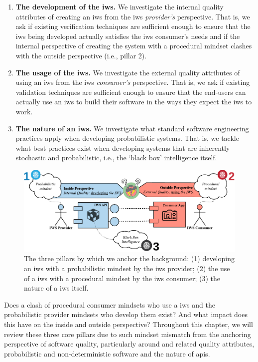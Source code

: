 \begin{enumerate}[label=\textbf{(\arabic*})]
\item \textbf{The development of the \gls{iws}.} We investigate the internal quality attributes of creating an \gls{iws} from the \gls{iws} \textit{provider's} perspective. That is, we ask if existing verification techniques are sufficient enough to ensure that the \gls{iws} being developed actually satisfies the \gls{iws} consumer's needs and if the internal perspective of creating the system with a procedural mindset clashes with the outside perspective (i.e., pillar 2).
\item \textbf{The usage of the \gls{iws}.} We investigate the external quality attributes of using an \gls{iws} from the \gls{iws} \textit{consumer's} perspective. That is, we ask if existing validation techniques are sufficient enough to ensure that the end-users can actually use an \gls{iws} to build their software in the ways they expect the \gls{iws} to work.
\item \textbf{The nature of an \gls{iws}.} We investigate what standard software engineering practices apply when developing probabilistic systems. That is, we tackle what best practices exist when developing systems that are inherently stochastic and probabilistic, i.e., the `black box' intelligence itself.
\end{enumerate}

\begin{figure}[hbt]
  \centering
  \includegraphics[width=\linewidth]{iws-mindset-clash-pillars}
  \caption[Mindset clashes within the development, use and nature of a IWS]{The three pillars by which we anchor the background: (1) developing an \gls{iws} with a probabilistic mindset by the \gls{iws} provider; (2) the use of a \gls{iws} with a procedural mindset by the \gls{iws} consumer; (3) the nature of a \gls{iws} itself.}
  \label{fig:background:preface:iws-mindset-clash-pillars}
\end{figure}

Does a clash of procedural consumer mindsets who use a \gls{iws} and the probabilistic provider mindsets who develop them exist? And what impact does this have on the inside and outside perspective? Throughout this chapter, we will review these three core pillars due to such  mindset mismatch from the anchoring perspective of software quality, particularly around  and related quality attributes, probabilistic and non-deterministic software and the nature of \glspl{api}. 

